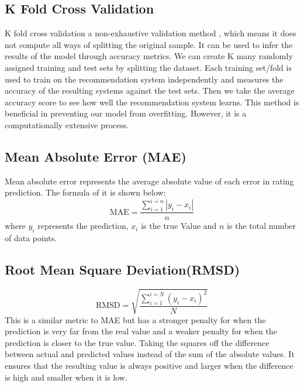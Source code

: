\subsection{K Fold Cross Validation}
K fold cross validation a non-exhaustive validation method \cite{KFold}, which means it does not compute all ways of splitting the original sample. 
It can be used to infer the results of the model through accuracy metrics. We can create K many randomly assigned training and test sets by splitting the dataset. Each training set/fold is used to train on the recommendation system independently and measures the accuracy of the resulting systems against the test sets. Then we take the average accuracy score to see how well the recommendation system learns. This method is beneficial in preventing our model from overfitting. However, it is a computationally extensive process.

\subsection{Mean Absolute Error (MAE)}
Mean absolute error represents the average absolute value of each error in rating prediction. The formula of it is shown below:
\begin{equation*}
\text{MAE} = \frac{\sum^{i=n}_{i=1}|y_{i} - x_{i}|}{n}
\end{equation*}
where $y_{i} $ represents the prediction, $x_{i} $ is the true Value and $n$ is the total number of data points. 

\subsection{Root Mean Square Deviation(RMSD)}
\begin{equation*}
\text{RMSD} = \sqrt{\frac{\sum^{i=N}_{i=1}(y_{i} - x_{i})^{2}}{N}}
\end{equation*}
This is a similar metric to MAE but has a stronger penalty for when the prediction is very far from the real value and a weaker penalty for when the prediction is closer to the true value. Taking the squares off the difference between actual and predicted values instead of the sum of the absolute values. It ensures that the resulting value is always positive and larger when the difference is high and smaller when it is low.



